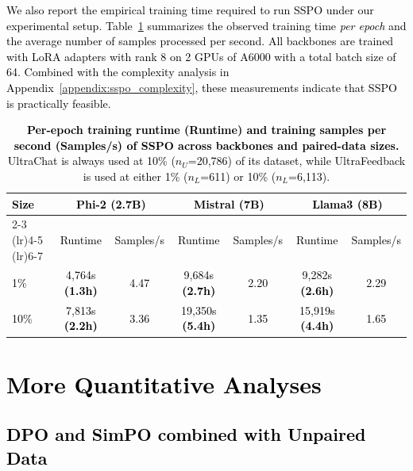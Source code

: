 \documentclass{article} %
\newcommand\rebuttal[1]{\textcolor{black}{#1}}
\begin{document}
\rebuttal{We also report the empirical training time required to run SSPO under our experimental setup. Table~\ref{tab:sspo_runtime} summarizes the observed training time \emph{per epoch} and the average number of samples processed per second. All backbones are trained with LoRA adapters with rank 8 on 2 GPUs of A6000 with a total batch size of 64. Combined with the complexity analysis in Appendix~\ref{appendix:sspo_complexity}, these measurements indicate that SSPO is practically feasible.}


\begin{table}[t]
\centering
\caption{\rebuttal{\textbf{Per-epoch training runtime (Runtime) and training samples per second (Samples/s) of SSPO across backbones and paired-data sizes.} UltraChat is always used at 10\% ($n_U$=20,786) of its dataset, while UltraFeedback is used at either 1\% ($n_L$=611) or 10\% ($n_L$=6,113).}}
\setlength{\tabcolsep}{2mm}
\label{tab:sspo_runtime}
    \begin{tabular}{l cc cc cc}
        \toprule
        \rebuttal{\textbf{Size}} 
        & \multicolumn{2}{c}{\rebuttal{\textbf{Phi-2 (2.7B)}}} 
        & \multicolumn{2}{c}{\rebuttal{\textbf{Mistral (7B)}}} 
        & \multicolumn{2}{c}{\rebuttal{\textbf{Llama3 (8B)}}} \\
        \cmidrule(lr){2-3} \cmidrule(lr){4-5} \cmidrule(lr){6-7}
        & \rebuttal{Runtime} & \rebuttal{Samples/s} 
        & \rebuttal{Runtime} & \rebuttal{Samples/s} 
        & \rebuttal{Runtime} & \rebuttal{Samples/s} \\
        \midrule
        \rebuttal{1\%} 
        & \rebuttal{4,764s \textbf{(1.3h)}} & \rebuttal{4.47} 
        & \rebuttal{9,684s \textbf{(2.7h)}} & \rebuttal{2.20} 
        & \rebuttal{9,282s \textbf{(2.6h)}} & \rebuttal{2.29} \\
        \rebuttal{10\%}  
        & \rebuttal{7,813s \textbf{(2.2h)}} & \rebuttal{3.36} 
        & \rebuttal{19,350s \textbf{(5.4h)}} & \rebuttal{1.35} 
        & \rebuttal{15,919s \textbf{(4.4h)}} & \rebuttal{1.65} \\
        \toprule
    \end{tabular}
\end{table}

\section{\rebuttal{More Quantitative Analyses}}
\label{appendix:more_quantitative_analyses}

\subsection{\rebuttal{DPO and SimPO combined with Unpaired Data}}
\end{document}
